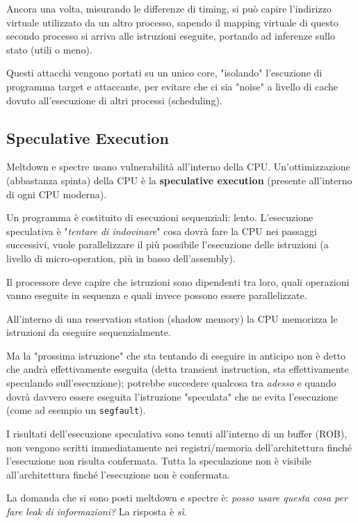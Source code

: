 Ancora una volta, misurando le differenze di timing, si può capire l'indirizzo virtuale utilizzato da un altro processo, sapendo il mapping virtuale di questo secondo processo si arriva alle istruzioni eseguite, portando ad inferenze sullo stato (utili o meno).

Questi attacchi vengono portati su un unico core, "isolando" l'escuzione di programma target e attaccante, per evitare che ci sia "noise" a livello di cache dovuto all'esecuzione di altri processi (scheduling).

\subsection{Speculative Execution}

Meltdown e spectre usano vulnerabilità all'interno della CPU. Un'ottimizzazione (abbastanza spinta) della CPU è la \textbf{speculative execution} (presente all'interno di ogni CPU moderna). 

Un programma è costituito di esecuzioni sequenziali: lento. L'esecuzione speculativa è "\textit{tentare di indovinare}" cosa dovrà fare la CPU nei passaggi successivi, vuole parallelizzare il più possibile l'esecuzione delle istruzioni (a livello di micro-operation, più in basso dell'assembly). 

Il processore deve capire che istruzioni sono dipendenti tra loro, quali operazioni vanno eseguite in sequenza e quali invece possono essere parallelizzate.

All'interno di una reservation station (shadow memory) la CPU memorizza le istruzioni da eseguire sequenzialmente. 

Ma la "prossima istruzione" che sta tentando di eseguire in anticipo non è detto che andrà effettivamente eseguita (detta transient instruction, sta effettivamente speculando sull'esecuzione); potrebbe succedere qualcosa tra \textit{adesso} e quando dovrà davvero essere eseguita l'istruzione "speculata" che ne evita l'esecuzione (come ad esempio un \texttt{segfault}).

I risultati dell'esecuzione speculativa sono tenuti all'interno di un buffer (ROB), non vengono scritti immediatamente nei registri/memoria dell'architettura finché l'esecuzione non risulta confermata. Tutta la speculazione non è visibile all'architettura finché l'esecuzione non è confermata.


La domanda che si sono posti meltdown e spectre è: \textit{posso usare questa cosa per fare leak di informazioni?} La risposta è \textit{sì}.

